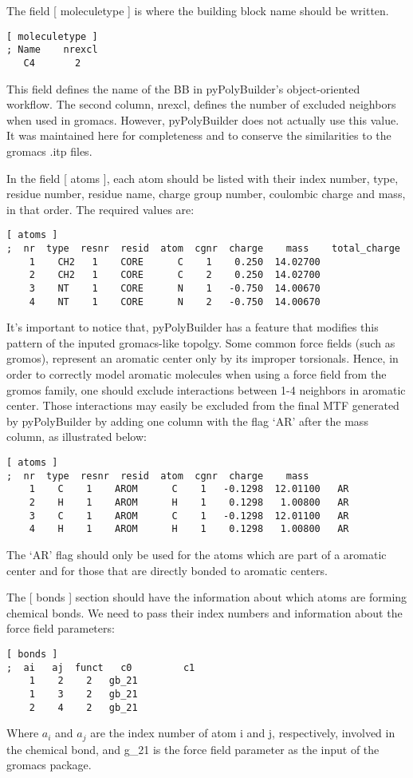 \documentclass[12pt]{article}
\begin{document}
The field [ moleculetype ] is where the building block name should be written.
\begin{lstlisting}
[ moleculetype ]
; Name    nrexcl
   C4       2
\end{lstlisting}
This field defines the name of the BB in pyPolyBuilder's object-oriented workflow.
The second column, nrexcl, defines the number of excluded neighbors when used in gromacs. 
However, pyPolyBuilder does not actually use this value. It was maintained here for completeness and to conserve the similarities to the gromacs .itp files.

In the field [ atoms ], each atom should be listed with their index number, type, residue number, residue name, charge group number, coulombic charge and mass, in that order. The required values are:

\begin{lstlisting}
[ atoms ]
;  nr  type  resnr  resid  atom  cgnr  charge    mass    total_charge
    1    CH2   1    CORE      C    1    0.250  14.02700
    2    CH2   1    CORE      C    2    0.250  14.02700
    3    NT    1    CORE      N    1   -0.750  14.00670
    4    NT    1    CORE      N    2   -0.750  14.00670
\end{lstlisting}

It's important to notice that, pyPolyBuilder has a feature that modifies this pattern of the inputed gromacs-like topolgy.
Some common force fields (such as gromos), represent an aromatic center only by its improper torsionals.
Hence, in order to correctly model aromatic molecules when using a force field from the gromos family, one should exclude interactions between 1-4 neighbors in aromatic center.
Those interactions may easily be excluded from the final MTF generated by pyPolyBuilder by adding one column with the flag `AR' after the mass column, as illustrated below:

\begin{lstlisting}
[ atoms ]
;  nr  type  resnr  resid  atom  cgnr  charge    mass    
    1    C    1    AROM      C    1   -0.1298  12.01100   AR
    2    H    1    AROM      H    1    0.1298   1.00800   AR
    3    C    1    AROM      C    1   -0.1298  12.01100   AR
    4    H    1    AROM      H    1    0.1298   1.00800   AR
\end{lstlisting}

The `AR' flag should only be used for the atoms which are part of a aromatic center and for those that are directly bonded to aromatic centers.

The [ bonds ] section should have the information about which atoms are forming
chemical bonds. We need to pass their index numbers and information about
the force field parameters:
\begin{lstlisting}
[ bonds ]
;  ai   aj  funct   c0         c1
    1    2    2   gb_21
    1    3    2   gb_21
    2    4    2   gb_21
\end{lstlisting}
Where $a_i$ and $a_j$ are the index number of atom i and j, respectively, involved in the chemical bond, and g\_21 is the force field parameter as the input of the gromacs package.
\end{document}
